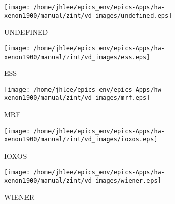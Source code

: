 \noindent
\vspace{0.6cm}
\begin{minipage}{.2\textwidth}
\begin{center}
\texttt{[image: /home/jhlee/epics\_env/epics-Apps/hw-xenon1900/manual/zint/vd\_images/undefined.eps]}
\end{center}
\end{minipage}
\begin{minipage}{.7\textwidth}
UNDEFINED
\end{minipage}


\noindent
\vspace{0.6cm}
\begin{minipage}{.2\textwidth}
\begin{center}
\texttt{[image: /home/jhlee/epics\_env/epics-Apps/hw-xenon1900/manual/zint/vd\_images/ess.eps]}
\end{center}
\end{minipage}
\begin{minipage}{.7\textwidth}
ESS
\end{minipage}


\noindent
\vspace{0.6cm}
\begin{minipage}{.2\textwidth}
\begin{center}
\texttt{[image: /home/jhlee/epics\_env/epics-Apps/hw-xenon1900/manual/zint/vd\_images/mrf.eps]}
\end{center}
\end{minipage}
\begin{minipage}{.7\textwidth}
MRF
\end{minipage}


\noindent
\vspace{0.6cm}
\begin{minipage}{.2\textwidth}
\begin{center}
\texttt{[image: /home/jhlee/epics\_env/epics-Apps/hw-xenon1900/manual/zint/vd\_images/ioxos.eps]}
\end{center}
\end{minipage}
\begin{minipage}{.7\textwidth}
IOXOS
\end{minipage}


\noindent
\vspace{0.6cm}
\begin{minipage}{.2\textwidth}
\begin{center}
\texttt{[image: /home/jhlee/epics\_env/epics-Apps/hw-xenon1900/manual/zint/vd\_images/wiener.eps]}
\end{center}
\end{minipage}
\begin{minipage}{.7\textwidth}
WIENER
\end{minipage}



